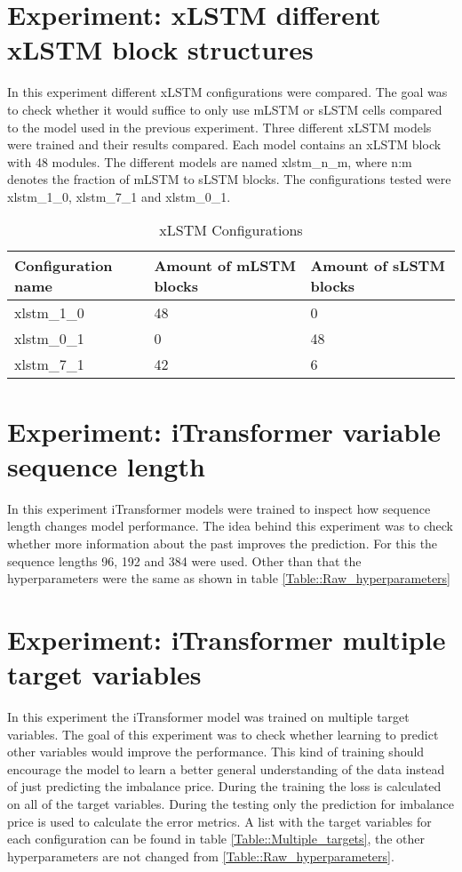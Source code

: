 \documentclass[class=scrbook, crop=false]{standalone}
\begin{document}
\section{Experiment: xLSTM different xLSTM block structures}
In this experiment different xLSTM configurations were compared. 
The goal was to check whether it would suffice to only use mLSTM or sLSTM cells compared to the model used in the previous experiment.
Three different xLSTM models were trained and their results compared.
Each model contains an xLSTM block with 48 modules.
The different models are named xlstm\_n\_m, where n:m denotes the fraction of mLSTM to sLSTM blocks.
The configurations tested were xlstm\_1\_0, xlstm\_7\_1 and xlstm\_0\_1. 

  \begin{table}[]
\centering
\begin{tabular}{l|l|l}
 Configuration name & Amount of mLSTM blocks & Amount of sLSTM blocks  \\\hline
 xlstm\_1\_0 & 48 & 0 \\
 xlstm\_0\_1 & 0 & 48 \\
 xlstm\_7\_1  & 42 & 6 
\end{tabular}
\caption{xLSTM Configurations}
\label{Table::xLSTM_configuratiosn}
\end{table}

\section{Experiment: iTransformer variable sequence length}
   
   In this experiment iTransformer models were trained to inspect how sequence length changes model performance.
   The idea behind this experiment was to check whether more information about the past improves the prediction.
   For this the sequence lengths 96, 192 and 384 were used. Other than that the hyperparameters were the same as shown in table \ref{Table::Raw_hyperparameters}   
   
\section{Experiment: iTransformer multiple target variables}

  In this experiment the iTransformer model was trained on multiple target variables.
  The goal of this experiment was to check whether learning to predict other variables would improve the performance.
  This kind of training should encourage the model to learn a better general understanding of the data instead of just predicting the imbalance price.
  During the training the loss is calculated on all of the target variables. 
  During the testing only the prediction for imbalance price is used to calculate the error metrics.
  A list with the target variables for each configuration can be found in table \ref{Table::Multiple_targets}, the other hyperparameters are not changed from \ref{Table::Raw_hyperparameters}.
  
\end{document}
